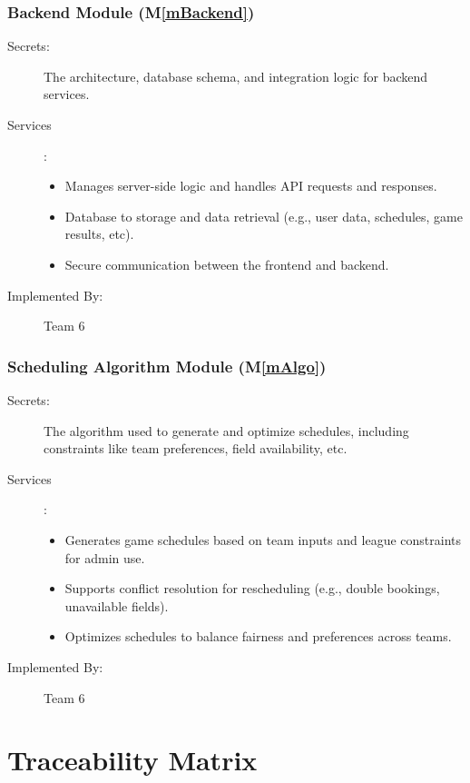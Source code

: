 \documentclass[12pt, titlepage]{article}
\newcommand{\mref}[1]{M\ref{#1}}
\begin{document}
\subsubsection{Backend Module (\mref{mBackend})}
\begin{description}
  \item[Secrets:] The architecture, database schema, and integration logic for backend services.
  \item[Services]:
        \begin{itemize}
          \item Manages server-side logic and handles API requests and responses.
          \item Database to storage and data retrieval (e.g., user data, schedules, game results, etc).
          \item Secure communication between the frontend and backend.
        \end{itemize}
  \item[Implemented By:] Team 6
\end{description}

\subsubsection{Scheduling Algorithm Module (\mref{mAlgo})}
\begin{description}
  \item[Secrets:] The algorithm used to generate and optimize schedules, including constraints like team preferences, field availability, etc.
  \item[Services]:
        \begin{itemize}
          \item Generates game schedules based on team inputs and league constraints for admin use.
          \item Supports conflict resolution for rescheduling (e.g., double bookings, unavailable fields).
          \item Optimizes schedules to balance fairness and preferences across teams.
        \end{itemize}
  \item[Implemented By:] Team 6
\end{description}

\section{Traceability Matrix} \label{SecTM}
\end{document}
